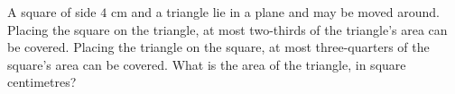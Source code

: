 A square of side $4$ cm and a triangle lie in a plane and may be moved around. Placing the square on the triangle, at most two-thirds of the triangle's area can be covered. Placing the triangle on the square, at most three-quarters of the square's area can be covered. What is the area of the triangle, in square centimetres?
